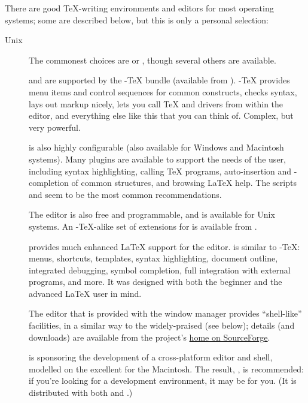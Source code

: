 There are good \TeX{}-writing environments and editors for most
operating systems; some are described below, but this is only a
personal selection:
\begin{description}
\item[Unix] The commonest choices are  or
  , though several others are available.
  
  \href{http://www.gnu.org/software/emacs/emacs.html}{\nobreakspace{}}
  and \href{http://www.xemacs.org/}{} are supported
  by the -\TeX{}
  bundle (available from ).  -\TeX{} provides menu
  items and control sequences for common constructs, checks syntax,
  lays out markup nicely, lets you call \TeX{} and drivers from
  within the editor, and everything else like this that you can think
  of.  Complex, but very powerful.

  \href{http://vim.sourceforge.net}{} is also highly
  configurable (also available for Windows and Macintosh systems).
  Many plugins are available to support the needs of the \AllTeX{} user,
  including syntax highlighting, calling \TeX{} programs,
  auto-insertion and -completion of common \AllTeX{} structures, and
  browsing \LaTeX{} help.  The scripts  and
   seem to be the most common recommendations.

  The editor \href{http://nedit.org/}{} is also free
  and programmable, and is available for Unix systems.  An
  -\TeX{}-alike set of extensions for  is available
  from .

   provides much enhanced \LaTeX{} support for the
  \href{http://www.jedsoft.org/jed/}{} editor.
   is similar to -\TeX{}: menus,
  shortcuts, templates, syntax highlighting, document outline,
  integrated debugging, symbol completion, full integration with
  external programs, and more. It was designed with both the beginner
  and the advanced LaTeX user in mind.

  The  editor that is provided with the 
  window manager provides  ``shell-like'' facilities, in a
  similar way to the widely-praised  (see below);
  details (and downloads) are available from the project's
  \href{http://kile.sourceforge.net/}{home on SourceForge}.

   is sponsoring the development of a cross-platform editor
  and shell, modelled on the excellent \texshop{} for the Macintosh.
  The result,
  \href{http://www.tug.org/texworks/}{\texworks{}}, is recommended: if
  you're looking for a
  \AllTeX{} development environment, it may be for you.  (It is
  distributed with both \texlive{} and \miktex{}.)


\end{description}
